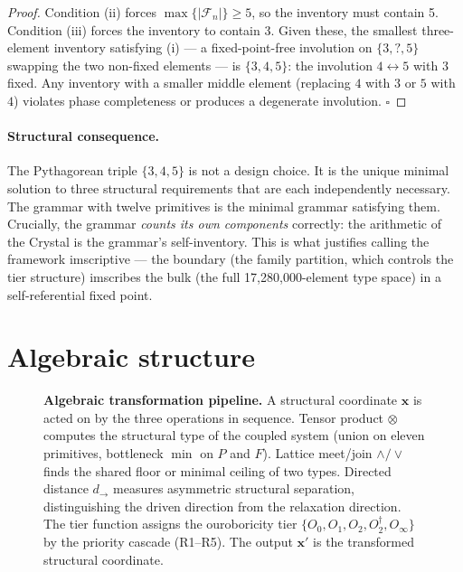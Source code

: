\documentclass[12pt,a4paper]{article}
\newcommand{\xvec}{\mathbf{x}}
\begin{document}
\begin{proof}
Condition (ii) forces $\max\{|\mathcal{F}_n|\} \geq 5$, so the
inventory must contain 5. Condition (iii) forces the inventory to
contain 3. Given these, the smallest three-element inventory satisfying
(i) --- a fixed-point-free involution on $\{3, ?, 5\}$ swapping
the two non-fixed elements --- is $\{3, 4, 5\}$: the involution
$4 \leftrightarrow 5$ with $3$ fixed. Any inventory with a smaller
middle element (replacing $4$ with $3$ or $5$ with $4$) violates
phase completeness or produces a degenerate involution. \qquad$\square$
\end{proof}

\paragraph{Structural consequence.}
The Pythagorean triple $\{3, 4, 5\}$ is not a design choice. It is the
unique minimal solution to three structural requirements that are each
independently necessary. The grammar with twelve primitives is the
minimal grammar satisfying them. Crucially, the grammar \emph{counts
its own components} correctly: the arithmetic of the Crystal is the
grammar's self-inventory. This is what justifies calling the framework
imscriptive --- the boundary (the family partition, which controls the
tier structure) imscribes the bulk (the full 17,280,000-element type
space) in a self-referential fixed point.

\section{Algebraic structure}
\label{sec:algebra}

\begin{figure}[H]
\centering
{}
\caption{\textbf{Algebraic transformation pipeline.} A structural
coordinate $\xvec$ is acted on by the three operations in sequence.
Tensor product $\otimes$ computes the structural type of the coupled
system (union on eleven primitives, bottleneck $\min$ on $P$ and $F$).
Lattice meet/join $\wedge/\vee$ finds the shared floor or minimal
ceiling of two types. Directed distance $d_\to$ measures asymmetric
structural separation, distinguishing the driven direction from the
relaxation direction. The tier function assigns the ouroboricity tier
$\{O_0, O_1, O_2, O_2^\dagger, O_\infty\}$ by the priority cascade
(R1--R5). The output $\xvec'$ is the transformed structural coordinate.}
\label{fig:pipeline}
\end{figure}
\end{document}
